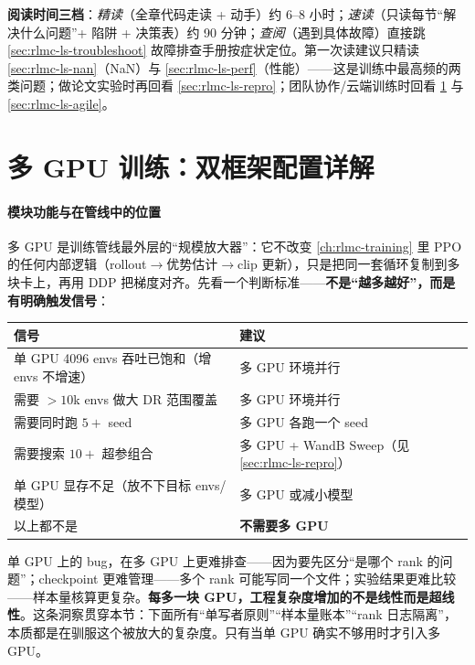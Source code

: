 \textbf{阅读时间三档}：\emph{精读}（全章代码走读 + 动手）约 6--8 小时；\emph{速读}（只读每节“解决什么问题”+ 陷阱 + 决策表）约 90 分钟；\emph{查阅}（遇到具体故障）直接跳 \cref{sec:rlmc-ls-troubleshoot} 故障排查手册按症状定位。第一次读建议只精读 \cref{sec:rlmc-ls-nan}（NaN）与 \cref{sec:rlmc-ls-perf}（性能）——这是训练中最高频的两类问题；做论文实验时再回看 \cref{sec:rlmc-ls-repro}；团队协作/云端训练时回看 \cref{sec:rlmc-ls-multigpu} 与 \cref{sec:rlmc-ls-agile}。

\section{多 GPU 训练：双框架配置详解}
\label{sec:rlmc-ls-multigpu}

\paragraph{\texorpdfstring{ 模块功能与在管线中的位置}{1 模块功能与在管线中的位置}}多 GPU 是训练管线最外层的“规模放大器”：它不改变 \cref{ch:rlmc-training} 里 PPO 的任何内部逻辑（rollout$\to$优势估计$\to$clip 更新），只是把同一套循环复制到多块卡上，再用 DDP 把梯度对齐。先看一个判断标准——\textbf{不是“越多越好”，而是有明确触发信号}：

\begin{center}
\small
\begin{tabular}{@{}p{7.4cm}p{4.6cm}@{}}
\toprule
信号 & 建议 \\
\midrule
单 GPU 4096 envs 吞吐已饱和（增 envs 不增速） & 多 GPU 环境并行 \\
需要 $>10$k envs 做大 DR 范围覆盖 & 多 GPU 环境并行 \\
需要同时跑 $5+$ seed & 多 GPU 各跑一个 seed \\
需要搜索 $10+$ 超参组合 & 多 GPU + WandB Sweep（见 \cref{sec:rlmc-ls-repro}） \\
单 GPU 显存不足（放不下目标 envs/模型） & 多 GPU 或减小模型 \\
以上都不是 & \textbf{不需要多 GPU} \\
\bottomrule
\end{tabular}
\end{center}

\begin{insight}\label{ins:rlmc-ls-multigpu}
单 GPU 上的 bug，在多 GPU 上更难排查——因为要先区分“是哪个 rank 的问题”；checkpoint 更难管理——多个 rank 可能写同一个文件；实验结果更难比较——样本量核算更复杂。\textbf{每多一块 GPU，工程复杂度增加的不是线性而是超线性}。这条洞察贯穿本节：下面所有“单写者原则”“样本量账本”“rank 日志隔离”，本质都是在驯服这个被放大的复杂度。只有当单 GPU 确实不够用时才引入多 GPU。
\end{insight}

